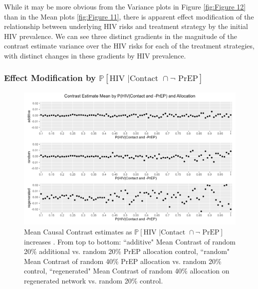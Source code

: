 \documentclass{article}
\theoremstyle{definition}
\begin{document}
While it may be more obvious from the Variance plots in Figure \ref{fig:Figure 12} than in the Mean plots \ref{fig:Figure 11}, there is apparent effect modification of the relationship between underlying HIV risks and treatment strategy by the initial HIV prevalence. We can see three distinct gradients in the magnitude of the contrast estimate variance over the HIV risks for each of the treatment strategies, with distinct changes in these gradients by HIV prevalence. 
\subsubsection{Effect Modification by \texorpdfstring{$\mathbb{P}[\text{HIV } | \text {Contact } \cap \neg \text{ PrEP}]$}{ℙ[HIV | ¬PrEP]}}
\begin{figure}[H]
    \centering
    \includegraphics[width=\linewidth]{Figures/p1 Mean plots.png}
    \caption{Mean Causal Contrast estimates as $\mathbb{P}\left[\text{HIV } \vert \text {Contact } \cap \neg \text{ PrEP}\right]$ increases . From top to bottom: ``additive" Mean Contrast of random 20\% additional vs. random 20\% PrEP allocation control, ``random" Mean Contrast of random 40\% PrEP allocation vs. random 20\% control, ``regenerated" Mean Contrast of random 40\% allocation on regenerated network vs. random 20\% control.}
    \label{fig:Figure 13}
\end{figure}
\end{document}
